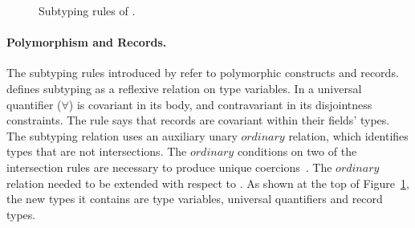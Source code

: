\begin{figure}[t]
\begin{spacing}{0.5}
\end{spacing}
  \caption{Subtyping rules of \name.}
  \label{fig:fi-subtype}
\end{figure}




\paragraph{Polymorphism and Records.}
The subtyping rules introduced by \name refer to polymorphic constructs and records. 
 defines subtyping as a reflexive relation on type variables.
In  a universal quantifier ($\forall$) 
is covariant in its body, and contravariant in its disjointness constraints.
The  rule says that records are covariant
within their fields' types.
The subtyping relation uses an auxiliary unary $ordinary$ relation,
which identifies types that are not intersections. The $ordinary$ conditions on two of the intersection rules are necessary to 
produce unique coercions~\cite{oliveira16disjoint}. The $ordinary$
relation needed to be extended with respect to \oldname.
As shown at the top of Figure~\ref{fig:fi-subtype}, the new types it contains are 
type variables, universal quantifiers and record types.

